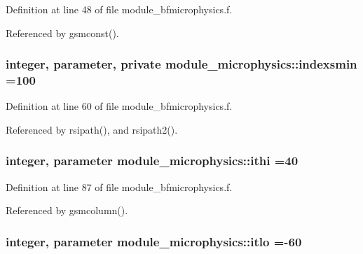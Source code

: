 Definition at line 48 of file module\+\_\+bfmicrophysics.\+f.



Referenced by gsmconst().

\subsubsection[{\texorpdfstring{indexsmin}{indexsmin}}]{\setlength{\rightskip}{0pt plus 5cm}integer, parameter, private module\+\_\+microphysics\+::indexsmin =100\hspace{0.3cm}{\ttfamily [private]}}\hypertarget{namespacemodule__microphysics_a48966fa99ac5a7268ef5f473a675eeb2}{}\label{namespacemodule__microphysics_a48966fa99ac5a7268ef5f473a675eeb2}


Definition at line 60 of file module\+\_\+bfmicrophysics.\+f.



Referenced by rsipath(), and rsipath2().

\subsubsection[{\texorpdfstring{ithi}{ithi}}]{\setlength{\rightskip}{0pt plus 5cm}integer, parameter module\+\_\+microphysics\+::ithi =40}\hypertarget{namespacemodule__microphysics_aac47e36935bcfaf088e6d0cb266d74f5}{}\label{namespacemodule__microphysics_aac47e36935bcfaf088e6d0cb266d74f5}


Definition at line 87 of file module\+\_\+bfmicrophysics.\+f.



Referenced by gsmcolumn().

\subsubsection[{\texorpdfstring{itlo}{itlo}}]{\setlength{\rightskip}{0pt plus 5cm}integer, parameter module\+\_\+microphysics\+::itlo =-\/60}\hypertarget{namespacemodule__microphysics_ada649157311835e0fa4c4d24057d5aa4}{}\label{namespacemodule__microphysics_ada649157311835e0fa4c4d24057d5aa4}


